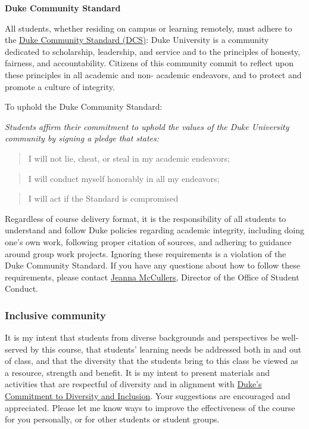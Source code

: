 \documentclass[
]{article}
\begin{document}
\textbf{Duke Community Standard}

All students, whether residing on campus or learning remotely, must
adhere to the
\href{https://trinity.duke.edu/undergraduate/academic-policies/community-standard-student-conduct}{Duke
Community Standard (DCS)}: Duke University is a community dedicated to
scholarship, leadership, and service and to the principles of honesty,
fairness, and accountability. Citizens of this community commit to
reflect upon these principles in all academic and non- academic
endeavors, and to protect and promote a culture of integrity.

To uphold the Duke Community Standard:

\emph{Students affirm their commitment to uphold the values of the Duke
University community by signing a pledge that states:}

\begin{quote}
I will not lie, cheat, or steal in my academic endeavors;
\end{quote}

\begin{quote}
I will conduct myself honorably in all my endeavors;
\end{quote}

\begin{quote}
I will act if the Standard is compromised
\end{quote}

Regardless of course delivery format, it is the responsibility of all
students to understand and follow Duke policies regarding academic
integrity, including doing one's own work, following proper citation of
sources, and adhering to guidance around group work projects. Ignoring
these requirements is a violation of the Duke Community Standard. If you
have any questions about how to follow these requirements, please
contact \href{mailto:jeanna.mccullers@duke.edu}{Jeanna McCullers},
Director of the Office of Student Conduct.

\hypertarget{inclusive-community}{%
\subsubsection{Inclusive community}\label{inclusive-community}}

It is my intent that students from diverse backgrounds and perspectives
be well-served by this course, that students' learning needs be
addressed both in and out of class, and that the diversity that the
students bring to this class be viewed as a resource, strength and
benefit. It is my intent to present materials and activities that are
respectful of diversity and in alignment with
\href{https://provost.duke.edu/initiatives/commitment-to-diversity-and-inclusion}{Duke's
Commitment to Diversity and Inclusion}. Your suggestions are encouraged
and appreciated. Please let me know ways to improve the effectiveness of
the course for you personally, or for other students or student groups.
\end{document}
